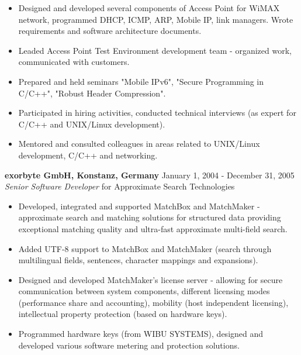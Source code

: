 \documentclass[a4paper,12pt,]{article}
\begin{document}
\begin{description}
\begin{itemize}
    \item Designed and developed several components of Access Point for WiMAX network, programmed 
       DHCP, ICMP, ARP, Mobile IP, link managers. Wrote requirements and software architecture documents. 

    \item Leaded Access Point Test Environment development team - organized work, communicated with
       customers. 

    \item Prepared and held seminars "Mobile IPv6", "Secure Programming in C/C++", "Robust Header Compression".

    \item Participated in hiring activities, conducted technical interviews 
        (as expert for C/C++ and UNIX/Linux development).

    \item Mentored and consulted colleagues in areas related to UNIX/Linux development, C/C++ and networking. 

    \end{itemize}

  \item{\bfseries exorbyte GmbH, Konstanz, Germany} \hfill January 1, 2004 - December 31, 2005 \\ 
    {\em Senior Software Developer} for Approximate Search Technologies
    
    \begin{itemize}
      
    \item Developed, integrated and supported MatchBox and MatchMaker
      - {approximate} search and matching solutions for structured data providing
      exceptional matching quality and ultra-fast approximate multi-field search.
    
    \item Added UTF-8 support to MatchBox and MatchMaker (search through multilingual fields,
      sentences, character mappings and expansions).

    \item Designed and developed MatchMaker's license server - allowing for secure communication
      between system components, different licensing modes (performance share and accounting),
      mobility (host independent licensing), intellectual property protection (based on hardware keys).

    \item Programmed hardware keys (from WIBU SYSTEMS), designed and developed various software metering
      and protection solutions.


\end{itemize}
\end{description}
\end{document}
